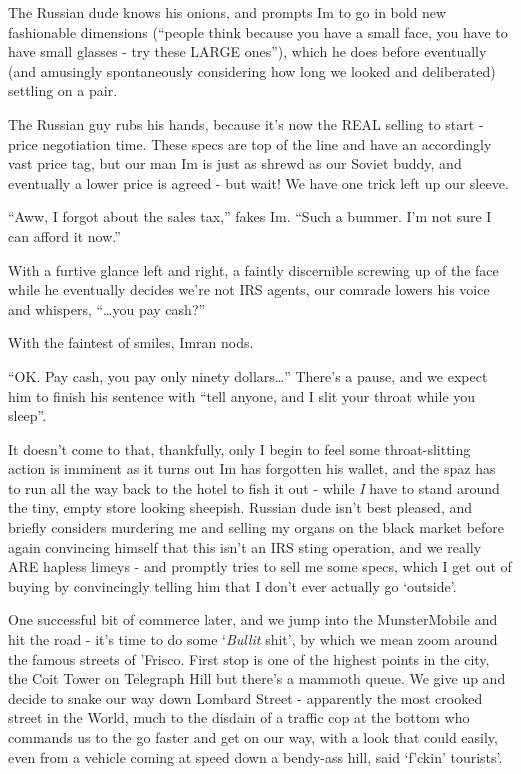 \documentclass[a5paper,titlepage,draft]{book}
\begin{document}
The Russian dude knows his onions, and prompts Im to go in bold new fashionable dimensions (``people think because you have a small face, you have to have small glasses - try these LARGE ones''), which he does before eventually (and amusingly spontaneously considering how long we looked and deliberated) settling on a pair.

The Russian guy rubs his hands, because it's now the REAL selling to start - price negotiation time.  These specs are top of the line and have an accordingly vast price tag, but our man Im is just as shrewd as our Soviet buddy, and eventually a lower price is agreed - but wait!  We have one trick left up our sleeve.

``Aww, I forgot about the sales tax,'' fakes Im.  ``Such a bummer.  I'm not sure I can afford it now.''

With a furtive glance left and right, a faintly discernible screwing up of the face while he eventually decides we're not IRS agents, our comrade lowers his voice and whispers, ``\ldots you pay cash?''

With the faintest of smiles, Imran nods.

``OK.  Pay cash, you pay only ninety dollars\ldots'' There's a pause, and we expect him to finish his sentence with ``tell anyone, and I slit your throat while you sleep''.

It doesn't come to that, thankfully, only I begin to feel some throat-slitting action is imminent as it turns out Im has forgotten his wallet, and the spaz has to run all the way back to the hotel to fish it out - while \emph{I} have to stand around the tiny, empty store looking sheepish.  Russian dude isn't best pleased, and briefly considers murdering me and selling my organs on the black market before again convincing himself that this isn't an IRS sting operation, and we really ARE hapless limeys - and promptly tries to sell me some specs, which I get out of buying by convincingly telling him that I don't ever actually go `outside'.

One successful bit of commerce later, and we jump into the MunsterMobile and hit the road - it's time to do some `\emph{Bullit} shit', by which we mean zoom around the famous streets of 'Frisco.  First stop is one of the highest points in the city, the Coit Tower on Telegraph Hill but there's a mammoth queue.  We give up and decide to snake our way down Lombard Street - apparently the most crooked street in the World, much to the disdain of a traffic cop at the bottom who commands us to the go faster and get on our way, with a look that could easily, even from a vehicle coming at speed down a bendy-ass hill, said `f'ckin' tourists'.
\end{document}
